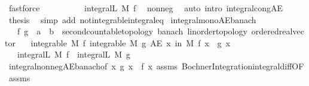 \begin{isabellebody}
\ fastforce\isanewline
\ \ \isamarkupfalse%
\isanewline
\ \ \isamarkupfalse%
\ \isamarkupfalse%
\ {\isachardoublequoteopen}{\isasymdots}\ {\isacharequal}{\kern0pt}\ integral\isactrlsup L\ M\ f{\isachardoublequoteclose}\ \isamarkupfalse%
\ nonneg\ \isamarkupfalse%
\ {\isacharparenleft}{\kern0pt}auto\ intro{\isacharcolon}{\kern0pt}\ integral{\isacharunderscore}{\kern0pt}cong{\isacharunderscore}{\kern0pt}AE{\isacharparenright}{\kern0pt}\isanewline
\ \ \isamarkupfalse%
\ \isamarkupfalse%
\ {\isacharquery}{\kern0pt}thesis\ \isacommand{{\isachardot}{\kern0pt}}\isamarkupfalse%
\isanewline
{}\isamarkupfalse%
\ {\isacharparenleft}{\kern0pt}simp\ add{\isacharcolon}{\kern0pt}\ not{\isacharunderscore}{\kern0pt}integrable{\isacharunderscore}{\kern0pt}integral{\isacharunderscore}{\kern0pt}eq{\isacharparenright}{\kern0pt}%
\endisatagproof
{\isafoldproof}%
%
\isadelimproof
\isanewline
%
\endisadelimproof
\isanewline
{}\isamarkupfalse%
\ integral{\isacharunderscore}{\kern0pt}mono{\isacharunderscore}{\kern0pt}AE{\isacharunderscore}{\kern0pt}banach{\isacharcolon}{\kern0pt}\isanewline
\ \ \ f\ g\ {\isacharcolon}{\kern0pt}{\isacharcolon}{\kern0pt}\ {\isachardoublequoteopen}{\isacharprime}{\kern0pt}a\ {\isasymRightarrow}\ {\isacharprime}{\kern0pt}b\ {\isacharcolon}{\kern0pt}{\isacharcolon}{\kern0pt}\ {\isacharbraceleft}{\kern0pt}second{\isacharunderscore}{\kern0pt}countable{\isacharunderscore}{\kern0pt}topology{\isacharcomma}{\kern0pt}\ banach{\isacharcomma}{\kern0pt}\ linorder{\isacharunderscore}{\kern0pt}topology{\isacharcomma}{\kern0pt}\ ordered{\isacharunderscore}{\kern0pt}real{\isacharunderscore}{\kern0pt}vector{\isacharbraceright}{\kern0pt}{\isachardoublequoteclose}\isanewline
\ \ \ {\isachardoublequoteopen}integrable\ M\ f{\isachardoublequoteclose}\ {\isachardoublequoteopen}integrable\ M\ g{\isachardoublequoteclose}\ {\isachardoublequoteopen}AE\ x\ in\ M{\isachardot}{\kern0pt}\ f\ x\ {\isasymle}\ g\ x{\isachardoublequoteclose}\isanewline
\ \ \ {\isachardoublequoteopen}integral\isactrlsup L\ M\ f\ {\isasymle}\ integral\isactrlsup L\ M\ g{\isachardoublequoteclose}\isanewline
%
\isadelimproof
\ \ %
\endisadelimproof
%
\isatagproof
{}\isamarkupfalse%
\ integral{\isacharunderscore}{\kern0pt}nonneg{\isacharunderscore}{\kern0pt}AE{\isacharunderscore}{\kern0pt}banach{\isacharbrackleft}{\kern0pt}of\ {\isachardoublequoteopen}{\isasymlambda}x{\isachardot}{\kern0pt}\ g\ x\ {\isacharminus}{\kern0pt}\ f\ x{\isachardoublequoteclose}{\isacharbrackright}{\kern0pt}\ assms\ Bochner{\isacharunderscore}{\kern0pt}Integration{\isachardot}{\kern0pt}integral{\isacharunderscore}{\kern0pt}diff{\isacharbrackleft}{\kern0pt}OF\ assms{\isacharparenleft}{\kern0pt}{}{\isacharcomma}{\kern0pt}{}{\isacharparenright}{\kern0pt}{\isacharbrackright}{\kern0pt}\ \isamarkupfalse%

\end{isabellebody}
